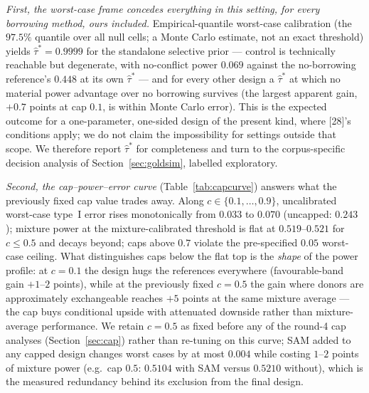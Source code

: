 \documentclass[11pt]{article}
\begin{document}
\emph{First, the worst-case frame concedes everything in this setting, for
every borrowing method, ours included.} Empirical-quantile worst-case
calibration (the $97.5\%$ quantile over all null cells; a Monte Carlo
estimate, not an exact threshold) yields $\hat\tau^{*} = 0.9999$ for the
standalone selective prior --- control is technically reachable but
degenerate, with no-conflict power $0.069$ against the no-borrowing
reference's $0.448$ at its own $\hat\tau^{*}$ --- and for every other design
a $\hat\tau^{*}$ at which no material power advantage over no borrowing
survives (the largest apparent gain, $+0.7$ points at cap $0.1$, is within
Monte Carlo error). This is the expected outcome for a one-parameter,
one-sided design of the present kind, where [28]'s conditions apply; we do
not claim the impossibility for settings outside that scope. We therefore
report $\hat\tau^{*}$ for completeness and turn to the corpus-specific
decision analysis of Section~\ref{sec:goldsim}, labelled exploratory.

\emph{Second, the cap--power--error curve} (Table~\ref{tab:capcurve})
answers what the previously fixed cap value trades away. Along
$c \in \{0.1,\dots,0.9\}$, uncalibrated worst-case type~I error rises
monotonically from $0.033$ to $0.070$ (uncapped: $0.243$); mixture power at
the mixture-calibrated threshold is flat at $0.519$--$0.521$ for
$c \le 0.5$ and decays beyond; caps above $0.7$ violate the pre-specified
$0.05$ worst-case ceiling. What distinguishes caps below the flat top is
the \emph{shape} of the power profile: at $c = 0.1$ the design hugs the
references everywhere (favourable-band gain $+1$--$2$ points), while at
the previously fixed $c = 0.5$ the gain where donors are approximately
exchangeable reaches $+5$ points at the same mixture average --- the cap
buys conditional upside with attenuated downside rather than
mixture-average performance. We retain $c = 0.5$ as fixed before any of the round-4 cap
analyses (Section~\ref{sec:cap}) rather than re-tuning on this curve; SAM added to
any capped design changes worst cases by at most $0.004$ while costing
$1$--$2$ points of mixture power (e.g.\ cap $0.5$: $0.5104$ with SAM versus
$0.5210$ without), which is the measured redundancy behind its exclusion
from the final design.
\end{document}
